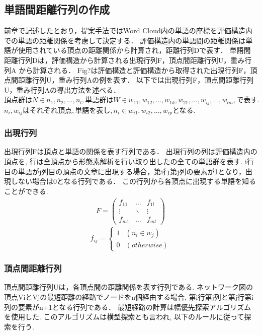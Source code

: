\documentclass[syuuron]{kuee}
\begin{document}
		\subsection{単語間距離行列の作成}
			前章で記述したとおり，提案手法ではWord Cloud内の単語の座標を評価構造内での単語の距離関係を考慮して決定する．
			評価構造内の単語間の距離関係は単語が使用されている頂点の距離関係から計算され，距離行列Dで表す．
			単語間距離行列Dは，評価構造から計算される出現行列F，頂点間距離行列U，重み行列A から計算される．
			Fig?は評価構造と評価構造から取得された出現行列F，頂点間距離行列U，重み行列Aの例を表す．
			以下では出現行列F，頂点間距離行列U，重み行列Aの導出方法を述べる．
			$頂点群はN \in {n_{1}, n_{2}, ..., n_{l}}, 単語群はW \in {w_{11}, w_{12}, ..., w_{1k}, w_{21},..., w_{ij},..., w_{lm}}, で表す. $
			$n_i,w_{ij}はそれぞれ頂点, 単語を表し, n_i \in {w_{i1}, w_{i2}, ..., w_{ip}}$となる. 
		
			\subsubsection{出現行列}
				出現行列Fは頂点と単語の関係を表す行列である．
				出現行列の列は評価構造内の頂点を, 行は全頂点から形態素解析を行い取り出したの全ての単語群を表す. 
				i行目の単語がj列目の頂点の文章に出現する場合，第i行第j列の要素が1となり，出現しない場合は0となる行列である．
				この行列から各頂点に出現する単語を知ることができる. 
				\begin{eqnarray}
				 F = \left(
				    \begin{array}{cccc}
				    	f_{11} & \ldots & f_{1l} \\
				    	\vdots & \ddots & \vdots \\
				    	f_{m1} & \ldots & f_{ml}
					\end{array}
				 \right)
				\end{eqnarray}	
				\[
				  f_{ij} = \left\{ \begin{array}{ll}
				    1 & (n_i \in w_j) \\
				    0 & (otherwise)
				  \end{array} \right.
				\]
				
			\subsubsection{頂点間距離行列}
				頂点間距離行列Uは，各頂点間の距離関係を表す行列である. 
				ネットワーク図の頂点ViとVjの最短距離の経路でノードをn個経由する場合, 
				第i行第j列と第j行第i列の要素がn+1となる行列である．
				最短経路の計算は幅優先探索アルゴリズムを使用した. 
				このアルゴリズムは横型探索とも言われ, 以下のルールに従って探索を行う. 
				
\end{document}
